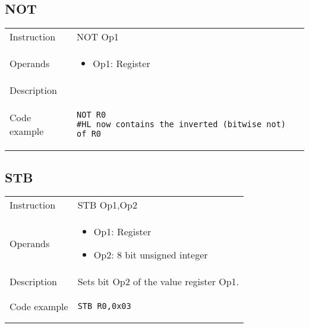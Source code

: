 \subsection{NOT}
\renewcommand*{\arraystretch}{2.0}
\begin{longtable}{P{3cm}P{9cm}}
\midrule
\noindent Instruction & NOT Op1 \\
\noindent Operands &
\begin{itemize}[label={},noitemsep,leftmargin=*,topsep=0pt,partopsep=0pt, itemsep=1em]
\item Op1: Register
\end{itemize}\\
\noindent Description &  \\
\noindent Code example & 
\begin{lstlisting}
NOT R0
#HL now contains the inverted (bitwise not) of R0
\end{lstlisting} \\
\end{longtable}

\newpage

\subsection{STB}
\renewcommand*{\arraystretch}{2.0}
\begin{longtable}{P{3cm}P{9cm}}
\midrule
\noindent Instruction & STB Op1,Op2 \\
\noindent Operands &
\begin{itemize}[label={},noitemsep,leftmargin=*,topsep=0pt,partopsep=0pt, itemsep=1em]
\item Op1: Register

\item Op2: 8 bit unsigned integer
\end{itemize}\\
\noindent Description & Sets bit Op2 of the value register Op1. \\
\noindent Code example & 
\begin{lstlisting}
STB R0,0x03
\end{lstlisting} \\
\end{longtable}


